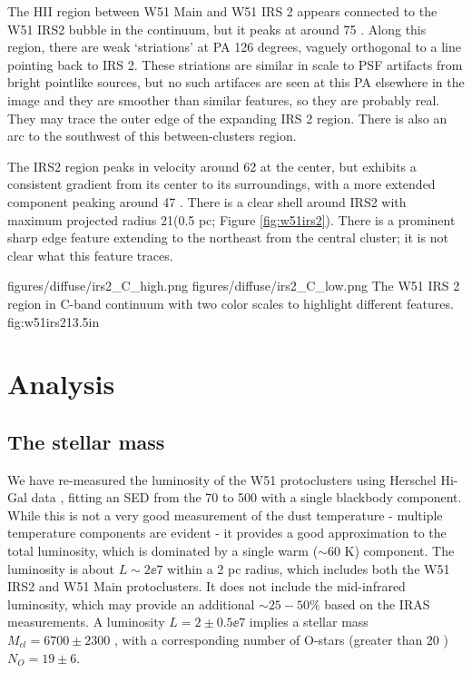The HII region between W51 Main and W51 IRS 2 appears connected to the W51 IRS2
bubble in the continuum, but it peaks at around 75 \kms.  Along this region,
there are weak `striations' at PA 126 degrees, vaguely orthogonal to a line
pointing back to IRS 2.  These striations are similar in scale to PSF artifacts
from bright pointlike sources, but no such artifaces are seen at this PA
elsewhere in the image and they are smoother than similar features, so they are
probably real.  They may trace the outer edge of the expanding IRS 2 region.
There is also an arc to the southwest of this between-clusters region.

The IRS2 region peaks in velocity around 62 \kms at the center, but exhibits a
consistent gradient from its center to its surroundings, with a more extended
component peaking around 47 \kms.  There is a clear shell around IRS2
with maximum projected radius 21\arcsec (0.5 pc; Figure \ref{fig:w51irs2}).
There is a prominent sharp edge feature extending to the northeast from the
central cluster; it is not clear what this feature traces.

\FigureTwo
{figures/diffuse/irs2_C_high.png}
{figures/diffuse/irs2_C_low.png}
{The W51 IRS 2 region in C-band continuum with two color scales to highlight
different features.}
{fig:w51irs2}{1}{3.5in}

\section{Analysis}
\subsection{The stellar mass}

We have re-measured the luminosity of the W51 protoclusters using Herschel
Hi-Gal data \citep{Molinari2010a,Traficante2011a}, fitting an SED from the 70
to 500 \um with a single blackbody component.  While this is not a very good
measurement of the dust temperature - multiple temperature components are
evident \citep{Sievers1991a} - it provides a good approximation to the total
luminosity, which is dominated by a single warm ($\sim60$ K) component.  The
luminosity is about $L\sim2\ee{7}$ \lsun within a 2 pc radius, which includes
both the W51 IRS2 and W51 Main protoclusters.  It does not include the
mid-infrared luminosity, which may provide an additional $\sim25-50\%$ based on
the IRAS measurements. A luminosity $L=2\pm0.5\ee{7}$ \lsun implies a stellar
mass $M_{cl} = 6700 \pm 2300$ \msun, with a corresponding number of O-stars
(greater than 20 \msun) $N_O = 19 \pm 6$.

